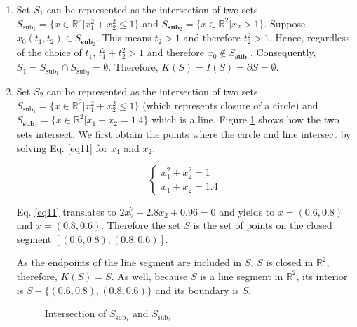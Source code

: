 \begin{enumerate}[label=(\alph*)]
\item Set $S_1$ can be represented as the intersection of two sets $S_{\text{sub}_1} = \{x \in \mathbb{R}^2 | x_1^2 + x_2^2 \leqslant 1 \}$ and $S_{\textbf{sub}_2} = \{x \in \mathbb{R}^2 | x_2 > 1 \}$.
Suppose $x_0(t_1, t_2) \in S_{\textbf{sub}_2}$.
This means $t_2 > 1$ and therefore $t_2^2 > 1$.
Hence, regardless of the choice of $t_1$, $t_1^2 + t_2^2 > 1$ and therefore $x_0 \notin S_{\textbf{sub}_1}$.
Consequently, $S_1 = S_{\text{sub}_1} \cap S_{\text{sub}_2} = \emptyset$.
Therefore, $K(S) = I(S) = \partial S = \emptyset$.

\item Set $S_2$ can be represented as the intersection of two sets $S_{\text{sub}_1} = \{x \in \mathbb{R}^2 | x_1^2 + x_2^2 \leqslant 1 \}$ (which represents closure of a circle) and $S_{\textbf{sub}_2} = \{x \in \mathbb{R}^2 | x_1 + x_2 = 1.4\}$ which is a line.
Figure \ref{fig11} shows how the two sets intersect.
We first obtain the points where the circle and line intersect by solving Eq. \ref{eq11} for $x_1$ and $x_2$.

\begin{equation}
\left\{ \begin{array}{ll} x_1^2 + x_2^2 = 1 \\ x_1 + x_2 = 1.4 \end{array} \right.
\label{eq11}
\end{equation}

Eq. \ref{eq11} translates to $2x_2^2 - 2.8x_2 + 0.96 = 0$ and yields to $x = (0.6, 0.8)$ and $x = (0.8, 0.6)$.
Therefore the set $S$ is the set of points on the closed segment $[(0.6,0.8),(0.8,0.6)]$.

As the endpoints of the line segment are included in $S$, $S$ is closed in $\mathbb{R}^2$, therefore, $K(S) = S$.
As well, because $S$ is a line segment in $\mathbb{R}^2$, its interior is $S - \{(0.6,0.8),(0.8,0.6)\}$ and its boundary is $S$.

\begin{figure}[H]\centering
{}
\caption{Intersection of $S_{\text{sub}_1}$ and $S_{\text{sub}_2}$}\label{fig11}
\end{figure}


\end{enumerate}

